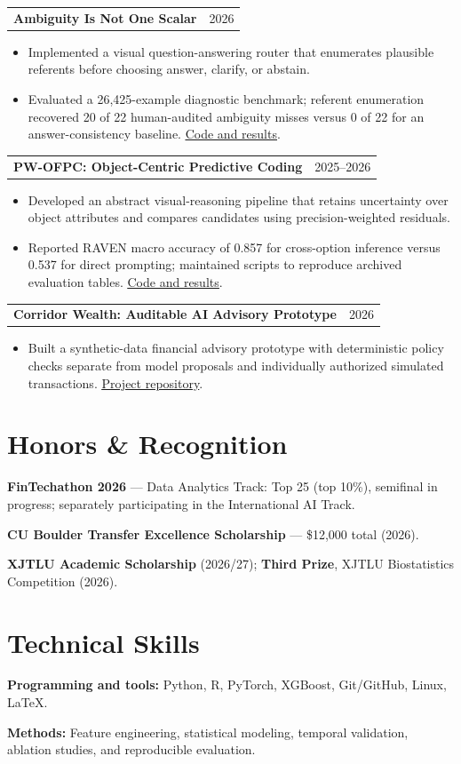 \documentclass[10pt,letterpaper]{article}
\makeatletter
\newcommand{\entry}[2]{%
  \begin{tabularx}{\textwidth}{@{}>{\raggedright\arraybackslash}X@{\hspace{12pt}}r@{}}
    \textbf{#1} & {\fontsize{9.5}{11.5}\selectfont\color{muted}#2}
  \end{tabularx}}
\newcommand{\projectgap}{\vspace{6pt}}
\newcommand{\cvlink}[2]{\href{#1}{\underline{#2}}}
\makeatother
\begin{document}
\projectgap
\entry{Ambiguity Is Not One Scalar}{2026}
\begin{itemize}
  \item Implemented a visual question-answering router that enumerates plausible referents before choosing answer, clarify, or abstain.
  \item Evaluated a 26,425-example diagnostic benchmark; referent enumeration recovered 20 of 22 human-audited ambiguity misses versus 0 of 22 for an answer-consistency baseline. \cvlink{https://github.com/pzy54154631-hub/ambiguity-is-not-one-scalar}{Code and results}.
\end{itemize}

\projectgap
\entry{PW-OFPC: Object-Centric Predictive Coding}{2025--2026}
\begin{itemize}
  \item Developed an abstract visual-reasoning pipeline that retains uncertainty over object attributes and compares candidates using precision-weighted residuals.
  \item Reported RAVEN macro accuracy of 0.857 for cross-option inference versus 0.537 for direct prompting; maintained scripts to reproduce archived evaluation tables. \cvlink{https://github.com/pzy54154631-hub/pw-ofpc}{Code and results}.
\end{itemize}

\projectgap
\entry{Corridor Wealth: Auditable AI Advisory Prototype}{2026}
\begin{itemize}
  \item Built a synthetic-data financial advisory prototype with deterministic policy checks separate from model proposals and individually authorized simulated transactions. \cvlink{https://github.com/pzy54154631-hub/Shenzhen-Fintech-international-Project}{Project repository}.
\end{itemize}

\section*{Honors \& Recognition}
\textbf{FinTechathon 2026} --- Data Analytics Track: Top 25 (top 10\%), semifinal in progress; separately participating in the International AI Track.\par
\vspace{4pt}
\textbf{CU Boulder Transfer Excellence Scholarship} --- \$12,000 total (2026).\par
\vspace{4pt}
\textbf{XJTLU Academic Scholarship} (2026/27); \textbf{Third Prize}, XJTLU Biostatistics Competition (2026).\par

\section*{Technical Skills}
\textbf{Programming and tools:} Python, R, PyTorch, XGBoost, Git/GitHub, Linux, LaTeX.\par
\vspace{4pt}
\textbf{Methods:} Feature engineering, statistical modeling, temporal validation, ablation studies, and reproducible evaluation.
\end{document}
